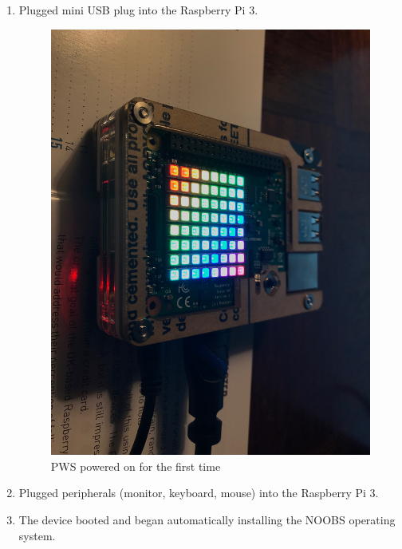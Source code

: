 \documentclass[sigconf]{acmart}
\begin{document}
\begin{enumerate}
\item Plugged mini USB plug into the Raspberry Pi 3.
\begin{figure}[H]
    \centering
    \includegraphics[width=\columnwidth]{images/ON.jpg}
    \caption{PWS powered on for the first time}
\end{figure}
\item Plugged peripherals (monitor, keyboard, mouse) into the Raspberry Pi 3.
\item The device booted and began automatically installing the NOOBS operating system.
\begin{figure}[H]
    \centering

\end{figure}
\end{enumerate}
\end{document}
